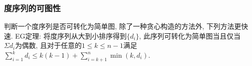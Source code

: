 \subsubsection{度序列的可图性}
\noindent
判断一个度序列是否可转化为简单图, 除了一种贪心构造的方法外, 下列方法更快速.
EG定理: 将度序列从大到小排序得到$\{d_i\}$, 此序列可转化为简单图当且仅当 $\Sigma d_i$为偶数, 且对于任意的$1\le k \le n-1$满足$\sum_{i=1}^{k} d_i \le k(k-1)+\sum_{i=k+1}^n \min(k, d_i)$.
